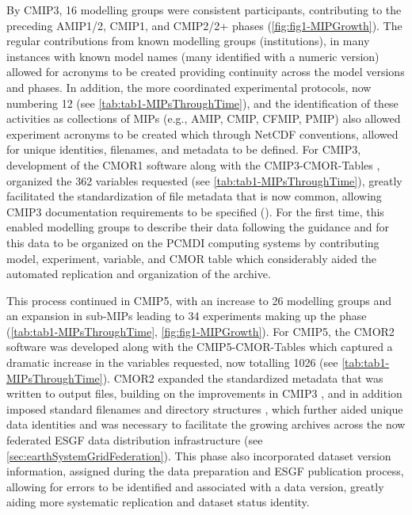 \documentclass[gmd, preprint]{copernicus}
\begin{document}
By CMIP3, 16 modelling groups were consistent participants, contributing to the preceding AMIP1/2, CMIP1, and CMIP2/2+ phases (\autoref{fig:fig1-MIPGrowth}). The regular contributions from known modelling groups (institutions), in many instances with known model names (many identified with a numeric version) allowed for acronyms to be created providing continuity across the model versions and phases. In addition, the more coordinated experimental protocols, now numbering 12 (see \autoref{tab:tab1-MIPsThroughTime}), and the identification of these activities as collections of MIPs (e.g., AMIP, CMIP, CFMIP, PMIP) also allowed experiment acronyms to be created which through NetCDF conventions, allowed for unique identities, filenames, and metadata to be defined. For CMIP3, development of the CMOR1 software \citep{taylor_cmor_2006} along with the CMIP3-CMOR-Tables \citep{doutriaux_cmip3_2005}, organized the 362 variables requested (see \autoref{tab:tab1-MIPsThroughTime}), greatly facilitated the standardization of file metadata that is now common, allowing CMIP3 documentation requirements to be specified (\citet{taylor_pcmdi_2005}). For the first time, this enabled modelling groups to describe their data following the guidance and for this data to be organized on the PCMDI computing systems by contributing model, experiment, variable, and CMOR table \citep{doutriaux_cmip3_2005} which considerably aided the automated replication and organization of the archive.

This process continued in CMIP5, with an increase to 26 modelling groups and an expansion in sub-MIPs leading to 34 experiments making up the phase (\autoref{tab:tab1-MIPsThroughTime}, \autoref{fig:fig1-MIPGrowth}).  For CMIP5, the CMOR2 software was developed \citep{doutriaux_cmor_2011} along with the CMIP5-CMOR-Tables \citep{doutriaux_cmip5_2013} which captured a dramatic increase in the variables requested, now totalling 1026 (see \autoref{tab:tab1-MIPsThroughTime}). CMOR2 expanded the standardized metadata that was written to output files, building on the improvements in CMIP3 \citep{taylor_pcmdi_2010}, and in addition imposed standard filenames and directory structures \citep{taylor_pcmdi_2012}, which further aided unique data identities and was necessary to facilitate the growing archives across the now federated ESGF data distribution infrastructure (see \autoref{sec:earthSystemGridFederation}). This phase also incorporated dataset version information, assigned during the data preparation and ESGF publication process, allowing for errors to be identified and associated with a data version, greatly aiding more systematic replication and dataset status identity. 
\end{document}
